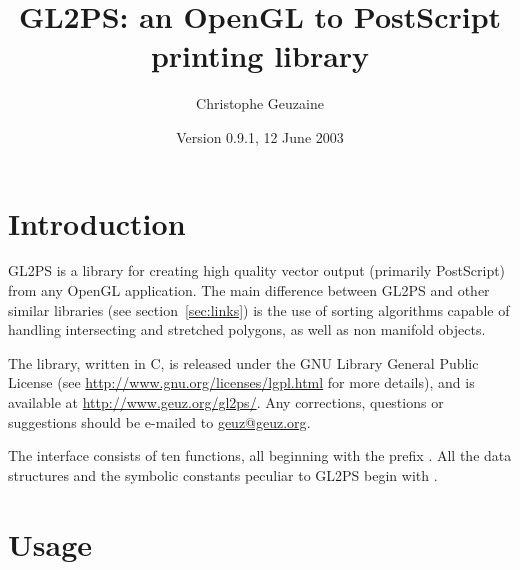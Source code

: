 \documentclass[10pt]{article}
\newcommand{\dd}{\begingroup\Url}
\newcommand{\email}[2]{\href{mailto:#2}{#1}}
\begin{document}
\title{GL2PS: an OpenGL to PostScript printing library}
\author{Christophe Geuzaine}
\date{Version 0.9.1, 12 June 2003}

\maketitle


\tableofcontents

\section{Introduction}

GL2PS is a library for creating high quality vector output (primarily
PostScript) from any OpenGL application. The main difference between GL2PS
and other similar libraries (see section~\ref{sec:links}) is the use of
sorting algorithms capable of handling intersecting and stretched polygons,
as well as non manifold objects.

The library, written in C, is released under the GNU Library General Public
License (see \url{http://www.gnu.org/licenses/lgpl.html} for more details),
and is available at \url{http://www.geuz.org/gl2ps/}. Any corrections,
questions or suggestions should be e-mailed to
\email{geuz@geuz.org}{geuz@geuz.org}.

The interface consists of ten functions, all beginning with the prefix
\dd{gl2ps}. All the data structures and the symbolic constants peculiar to
GL2PS begin with \dd{GL2PS}.

\section{Usage}

\end{document}
